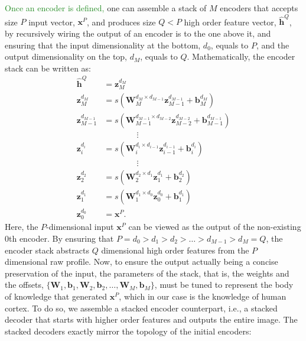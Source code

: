 \documentclass[11pt]{article}
\newcommand{\xacc}[1]{\textcolor{ForestGreen}{#1}}
\newcommand{\vecEC}[1]{\boldsymbol{#1}}
\newcommand{\WEC}{\vecEC{W}}                   %
\newcommand{\WEI}[3]{\WEC_{#1}^{d_{#2} \times d_{#3}}} %
\newcommand{\bEC}{\vecEC{b}}    %
\newcommand{\bEI}[2]{\bEC_{#1}^{d_{#2}}} %
\newcommand{\xEC}{\vecEC{x}}
\newcommand{\hHT}{\boldsymbol{\hat{h}}}
\newcommand{\zEC}{\vecEC{z}}
\newcommand{\zEI}[2]{\zEC_{#1}^{d_{#2}}}
\begin{document}
\xacc{Once an encoder is defined,} one can assemble a stack of $M$ encoders that accepts size $P$ input vector, $\xEC^P$, and produces size $Q<P$ high order feature vector, $\hHT^Q$, by recursively wiring the output of an encoder is to the one above it, and ensuring that the input dimensionality at the bottom, $d_0$, equals to $P$, and the output dimensionality on the top, $d_M$, equals to $Q$. Mathematically, the encoder stack can be written as:
\begin{equation} \label{eq:SE}
  \begin{split}
    \hHT^Q &= \zEI{M}{M} \\
    \zEI{M  }{M  } &= s(\WEI{M  }{M  }{M-1} \zEI{M-1}{M-1} + \bEI{M  }{M  }) \\
    \zEI{M-1}{M-1} &= s(\WEI{M-1}{M-1}{M-2} \zEI{M-2}{M-2} + \bEI{M-1}{M-1}) \\
    & \quad \quad \quad \quad \vdots \\
    \zEI{i  }{i  } &= s(\WEI{i  }{i  }{i-1} \zEI{i-1}{i-1} + \bEI{i  }{i  }) \\
    & \quad \quad \quad \quad \vdots \\
    \zEI{2  }{2  } &= s(\WEI{2  }{2  }{1  } \zEI{1  }{1  } + \bEI{2  }{2  }) \\
    \zEI{1  }{1  } &= s(\WEI{1  }{1  }{0  } \zEI{0  }{0  } + \bEI{1  }{1  }) \\
    \zEI{0  }{0  } &= \xEC^P.
  \end{split}
\end{equation}
Here, the $P$-dimensional input $\xEC^P$ can be viewed as the output of the non-existing $0$th encoder. By ensuring that $P = d_0 > d_1 > d_2 > \dots > d_{M-1} > d_M = Q$, the encoder stack abstracts $Q$ dimensional high order features from the $P$ dimensional raw profile. Now, to ensure the output actually being a concise preservation of the input, the parameters of the stack, that is, the weights and the offsets, $\{\WEC_1, \bEC_1, \WEC_2, \bEC_2, \dots, \WEC_M, \bEC_M\}$, must be tuned to represent the body of knowledge that generated $\xEC^P$, which in our case is the knowledge of human cortex. To do so, we assemble a stacked encoder counterpart, i.e., a stacked decoder that starts with higher order features and outputs the entire image. The stacked decoders exactly mirror the topology of the initial encoders:
\end{document}
